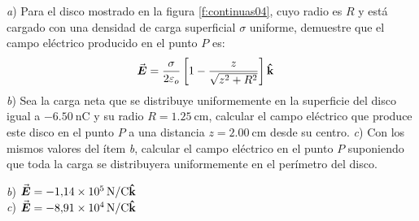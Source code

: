 \begin{center}
\end{center}
%
\begin{Exercise}\label{p:continuas04}
  \textbf{\raisebox{.5pt}{\textcircled{\raisebox{-1.2pt} {E}}}} \textit{a}) Para el disco mostrado en la figura \ref{f:continuas04}, cuyo radio es $R$ y está cargado con una densidad de carga superficial $\sigma$ uniforme, demuestre que el campo eléctrico producido en el punto $P$ es:
  \begin{align*}
    \va*{E} &= \frac{\sigma}{2\varepsilon_o} \left [ 1 - \frac{z}{\sqrt{z^2+R^2}} \right ] \vu{k}
  \end{align*}
  \textit{b}) Sea la carga neta que se distribuye uniformemente en la superficie del disco igual a $\SI{-6.50}{\nano\coulomb}$ y su radio $R = \SI{1.25}{\centi\metre}$, calcular el campo eléctrico que produce este disco en el punto $P$ a una distancia $z = \SI{2.00}{\centi\metre}$ desde su centro. \textit{c}) Con los mismos valores del ítem \textit{b}, calcular el campo eléctrico en el punto $P$ suponiendo que toda la carga se distribuyera uniformemente en el perímetro del disco.
\end{Exercise}
\begin{Answer}
  \begin{minipage}[t]{.4\textwidth}
    \textit{b}) $\va*{E} = \SI{-1.14E5}{\newton/\coulomb}\vu{k}$\\ \textit{c}) $\va*{E} = \SI{-8.91E4}{\newton/\coulomb}\vu{k}$
  \end{minipage}
\end{Answer}
